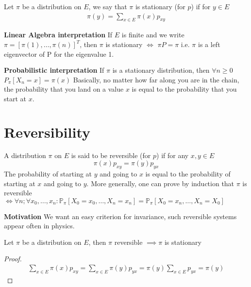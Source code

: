 \begin{defn}
	Let $\pi$ be a distribution on $E$, we say that $\pi$ is stationary (for $p$) if for $y \in E$
\begin{align}
	\boxed{ \pi(y) = \sum_{x \in E} \pi(x)p_{xy}}
\end{align}


\textbf{Linear Algebra interpretation} If $E$ is finite and we write  $\pi = [\pi(1), \ldots ,\pi(n)]^T$, then $\pi$ is stationary $ \iff$ $\pi P = \pi$ i.e. $\pi$ is a left eigenvector of P for the eigenvalue 1.

\textbf{Probabilistic interpretation} If $\pi $ is a stationary distribution, then $\forall n \geq 0$ $P_{\pi }[X_n =x] = \pi (x)$
\newline \indent
Basically, no matter how far along you are in the chain, the probability that you land on a value $x$ is equal to the probability that you start at $x$.
\end{defn}

\section{Reversibility}
\begin{defn}
	A distribution $\pi $ on $ E$ is said to be reversible (for $p$) if for any $x,y \in E$
\begin{equation}
	\pi (x) p_{xy}= \pi (y)p_{yx}
\end{equation}
The probability of starting at $y$ and going to $x$ is equal to the probability of starting at $x$ and going to $y$. More generally, one can prove by induction that $\pi $ is reversible $ \iff \forall n; \forall x_0, \ldots ,x_n: \mathbb{P}_{\pi } \left[ X_0=x_0, \ldots ,X_n=x_n \right] = \mathbb{P}_{\pi } \left[ X_0=x_n, \ldots ,X_n=X_0 \right] $
\end{defn}

\textbf{Motivation} We want an easy criterion for invariance, such reversible systems appear often in physics.

\begin{prop}[]
	Let $\pi $ be a distribution on $E$, then $\pi $ reversible $\implies \pi $ is stationary
\end{prop}
\begin{proof}
	\begin{align}
		\sum_{x \in E}^{} \pi (x)p_{xy} = \sum_{x \in E}^{} \pi (y) p_{yx} = \pi (y) \sum_{x \in E}^{} p_{yx} = \pi(y) 
	\end{align}
	
\end{proof}

